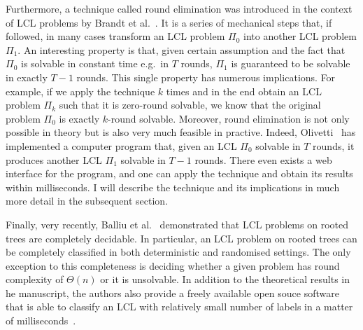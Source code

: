 Furthermore, a technique called round elimination was introduced in the context
of LCL problems by Brandt et al.~\cite{Brandt2019}. It is a series of mechanical
steps that, if followed, in many cases transform an LCL problem $\Pi_0$ into another LCL problem $\Pi_1$. An interesting property is that, given certain assumption and the fact that
$\Pi_0$ is solvable in constant time e.g.\ in $T$ rounds, $\Pi_1$ is guaranteed to be
solvable in exactly $T - 1$ rounds. This single property has numerous implications.
For example, if we apply the technique $k$ times and in the end obtain an LCL problem $\Pi_k$
such that it is zero-round solvable, we know that the original problem $\Pi_0$ is
exactly $k$-round solvable. Moreover, round elimination is not only possible
in theory but is also very much feasible in practive.
Indeed, Olivetti~\cite{Olivetti2020} has
implemented a computer program that, given an LCL $\Pi_0$ solvable in $T$ rounds,
it produces another LCL $\Pi_1$ solvable in $T - 1$ rounds. There even exists
a web interface for the program, and one can apply the technique and obtain
its results within milliseconds. I will describe the technique and its implications
in much more detail in the subsequent section.

Finally, very recently, Balliu et al.~\cite{Balliu2021} demonstrated
that LCL problems on rooted trees are completely decidable.
In particular, an LCL problem on rooted trees can be completely
classified in both deterministic and randomised settings. The only
exception to this completeness is deciding whether a given problem
has round complexity of $\Theta(n)$ or it is unsolvable. In addition
to the theoretical results in he manuscript, the authors also
provide a freely available open souce software that is able to
classify an LCL with relatively small number of labels in a matter
of milliseconds~\cite{Studeny2021}.
